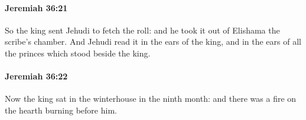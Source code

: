 		\paragraph{Jeremiah 36:21} %
			\label{JEREMIAH-36-21}

			So the king sent Jehudi to fetch the roll: and he took it out of Elishama the scribe’s chamber. And Jehudi read it in the ears of the king, and in the ears of all the princes which stood beside the king.


		\paragraph{Jeremiah 36:22} %
			\label{JEREMIAH-36-22}

			Now the king sat in the winterhouse in the ninth month: and there was a fire on the hearth burning before him.


